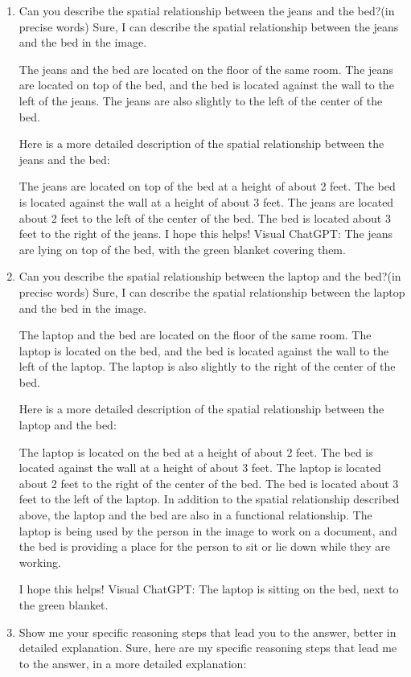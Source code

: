 \begin{enumerate}
    \item Can you describe the spatial relationship between the jeans and the bed?(in precise words)
    \subitem 
    Sure, I can describe the spatial relationship between the jeans and the bed in the image.
    
    The jeans and the bed are located on the floor of the same room. The jeans are located on top of the bed, and the bed is located against the wall to the left of the jeans. The jeans are also slightly to the left of the center of the bed.
    
    Here is a more detailed description of the spatial relationship between the jeans and the bed:
    
    The jeans are located on top of the bed at a height of about 2 feet.
    The bed is located against the wall at a height of about 3 feet.
    The jeans are located about 2 feet to the left of the center of the bed.
    The bed is located about 3 feet to the right of the jeans.
    I hope this helps!
    \subitem Visual ChatGPT: The jeans are lying on top of the bed, with the green blanket covering them.
    \item Can you describe the spatial relationship between the laptop and the bed?(in precise words)
    \subitem 
    Sure, I can describe the spatial relationship between the laptop and the bed in the image.
    
    The laptop and the bed are located on the floor of the same room. The laptop is located on the bed, and the bed is located against the wall to the left of the laptop. The laptop is also slightly to the right of the center of the bed.
    
    Here is a more detailed description of the spatial relationship between the laptop and the bed:
    
    The laptop is located on the bed at a height of about 2 feet.
    The bed is located against the wall at a height of about 3 feet.
    The laptop is located about 2 feet to the right of the center of the bed.
    The bed is located about 3 feet to the left of the laptop.
    In addition to the spatial relationship described above, the laptop and the bed are also in a functional relationship. The laptop is being used by the person in the image to work on a document, and the bed is providing a place for the person to sit or lie down while they are working.
    
    I hope this helps!
    \subitem Visual ChatGPT: The laptop is sitting on the bed, next to the green blanket.
    \item Show me your specific reasoning steps that lead you to the answer, better in detailed explanation.
    \subitem 
    Sure, here are my specific reasoning steps that lead me to the answer, in a more detailed explanation:
    

\end{enumerate}
